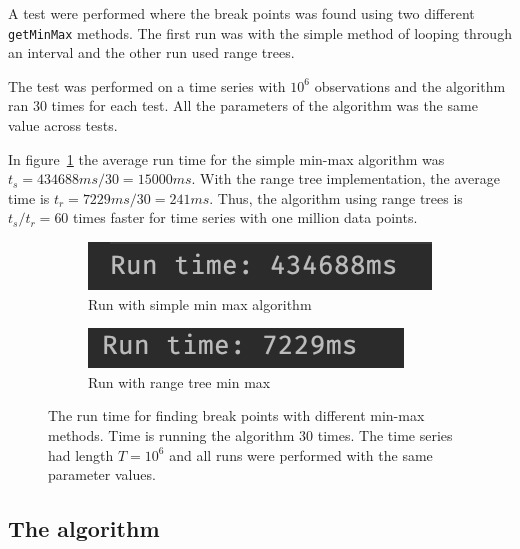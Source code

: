 A test were performed where the break points was found using two different
\texttt{getMinMax} methods. The first run was with the simple method of looping
through an interval and the other run used range trees. 

The test was performed on a time series with $10^6$ observations and the
algorithm ran 30 times for each test. All the parameters of the algorithm was
the same value across tests.

In figure~\ref{fig:run-simple} the average run time for the simple min-max
algorithm was $t_s = 434688 ms / 30 = 15000 ms$. With the range tree
implementation, the average time is $t_r = 7229 ms / 30 = 241 ms$. Thus, the
algorithm using range trees is $t_s / t_r = 60$ times faster for time series
with one million data points. 

\begin{figure}[ht]
    \centering
    \begin{subfigure}[b]{.48\textwidth}
        \centering
        \includegraphics[width=\textwidth]{fig/run-simple.png}
        \caption{Run with simple min max algorithm}
        \label{fig:run-simple}
    \end{subfigure}
    \hfill
    \begin{subfigure}[b]{.48\textwidth}
        \centering
        \includegraphics[width=\textwidth]{fig/run-range-tree.png}
        \caption{Run with range tree min max}
        \label{fig:run-range-tree}
    \end{subfigure}
    \caption{The run time for finding break points with different min-max methods. Time is running the algorithm 30 times. The time series had length $T = 10^6$ and all runs were performed with the same parameter values.}
    \label{fig:run-times}
\end{figure}

\subsection{The algorithm} \label{sec:test-the-algorithm}

